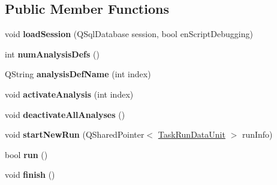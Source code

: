 \subsection*{Public Member Functions}
\begin{DoxyCompactItemize}
\item 
\hypertarget{class_picto_1_1_analysis_container_ab6c262de4147e6e805cece7041a7c6ef}{void {\bfseries load\-Session} (Q\-Sql\-Database session, bool en\-Script\-Debugging)}\label{class_picto_1_1_analysis_container_ab6c262de4147e6e805cece7041a7c6ef}

\item 
\hypertarget{class_picto_1_1_analysis_container_ac01859010e5041088789e9a821748ed4}{int {\bfseries num\-Analysis\-Defs} ()}\label{class_picto_1_1_analysis_container_ac01859010e5041088789e9a821748ed4}

\item 
\hypertarget{class_picto_1_1_analysis_container_a65fd7941dd4925f6708356ba93c31a38}{Q\-String {\bfseries analysis\-Def\-Name} (int index)}\label{class_picto_1_1_analysis_container_a65fd7941dd4925f6708356ba93c31a38}

\item 
\hypertarget{class_picto_1_1_analysis_container_a6962a445a19be84e9397fc224e21a7af}{void {\bfseries activate\-Analysis} (int index)}\label{class_picto_1_1_analysis_container_a6962a445a19be84e9397fc224e21a7af}

\item 
\hypertarget{class_picto_1_1_analysis_container_aa29180b095eace92d75c000d312f3043}{void {\bfseries deactivate\-All\-Analyses} ()}\label{class_picto_1_1_analysis_container_aa29180b095eace92d75c000d312f3043}

\item 
\hypertarget{class_picto_1_1_analysis_container_aaa48701e64fb9ac2f4a226cb80715d52}{void {\bfseries start\-New\-Run} (Q\-Shared\-Pointer$<$ \hyperlink{class_picto_1_1_task_run_data_unit}{Task\-Run\-Data\-Unit} $>$ run\-Info)}\label{class_picto_1_1_analysis_container_aaa48701e64fb9ac2f4a226cb80715d52}

\item 
\hypertarget{class_picto_1_1_analysis_container_acccc993ae8116b60425605e520394c2d}{bool {\bfseries run} ()}\label{class_picto_1_1_analysis_container_acccc993ae8116b60425605e520394c2d}

\item 
\hypertarget{class_picto_1_1_analysis_container_aa8442b71baf99f3b7271b820ec264fdc}{void {\bfseries finish} ()}\label{class_picto_1_1_analysis_container_aa8442b71baf99f3b7271b820ec264fdc}


\end{DoxyCompactItemize}
